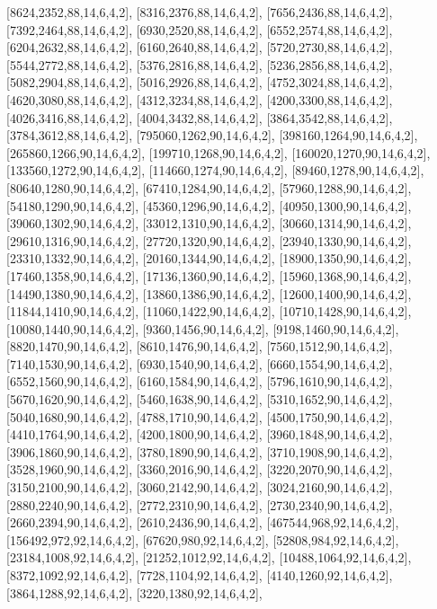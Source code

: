 \documentclass[12pt]{amsart}
\begin{document}
[8624,2352,88,14,6,4,2],   [8316,2376,88,14,6,4,2],   [7656,2436,88,14,6,4,2],   [7392,2464,88,14,6,4,2],   [6930,2520,88,14,6,4,2],   [6552,2574,88,14,6,4,2],
[6204,2632,88,14,6,4,2],   [6160,2640,88,14,6,4,2],   [5720,2730,88,14,6,4,2],   [5544,2772,88,14,6,4,2],   [5376,2816,88,14,6,4,2],   [5236,2856,88,14,6,4,2],
[5082,2904,88,14,6,4,2],   [5016,2926,88,14,6,4,2],   [4752,3024,88,14,6,4,2],   [4620,3080,88,14,6,4,2],   [4312,3234,88,14,6,4,2],   [4200,3300,88,14,6,4,2],
[4026,3416,88,14,6,4,2],   [4004,3432,88,14,6,4,2],   [3864,3542,88,14,6,4,2],   [3784,3612,88,14,6,4,2],   [795060,1262,90,14,6,4,2],   [398160,1264,90,14,6,4,2],
[265860,1266,90,14,6,4,2],   [199710,1268,90,14,6,4,2],   [160020,1270,90,14,6,4,2],   [133560,1272,90,14,6,4,2],   [114660,1274,90,14,6,4,2],
[89460,1278,90,14,6,4,2],   [80640,1280,90,14,6,4,2],   [67410,1284,90,14,6,4,2],   [57960,1288,90,14,6,4,2],   [54180,1290,90,14,6,4,2],   [45360,1296,90,14,6,4,2],
[40950,1300,90,14,6,4,2],   [39060,1302,90,14,6,4,2],   [33012,1310,90,14,6,4,2],   [30660,1314,90,14,6,4,2],   [29610,1316,90,14,6,4,2],   [27720,1320,90,14,6,4,2],
[23940,1330,90,14,6,4,2],   [23310,1332,90,14,6,4,2],   [20160,1344,90,14,6,4,2],   [18900,1350,90,14,6,4,2],   [17460,1358,90,14,6,4,2],   [17136,1360,90,14,6,4,2],
[15960,1368,90,14,6,4,2],   [14490,1380,90,14,6,4,2],   [13860,1386,90,14,6,4,2],   [12600,1400,90,14,6,4,2],   [11844,1410,90,14,6,4,2],   [11060,1422,90,14,6,4,2],
[10710,1428,90,14,6,4,2],   [10080,1440,90,14,6,4,2],   [9360,1456,90,14,6,4,2],   [9198,1460,90,14,6,4,2],   [8820,1470,90,14,6,4,2],   [8610,1476,90,14,6,4,2],
[7560,1512,90,14,6,4,2],   [7140,1530,90,14,6,4,2],   [6930,1540,90,14,6,4,2],   [6660,1554,90,14,6,4,2],   [6552,1560,90,14,6,4,2],   [6160,1584,90,14,6,4,2],
[5796,1610,90,14,6,4,2],   [5670,1620,90,14,6,4,2],   [5460,1638,90,14,6,4,2],   [5310,1652,90,14,6,4,2],   [5040,1680,90,14,6,4,2],   [4788,1710,90,14,6,4,2],
[4500,1750,90,14,6,4,2],   [4410,1764,90,14,6,4,2],   [4200,1800,90,14,6,4,2],   [3960,1848,90,14,6,4,2],   [3906,1860,90,14,6,4,2],   [3780,1890,90,14,6,4,2],
[3710,1908,90,14,6,4,2],   [3528,1960,90,14,6,4,2],   [3360,2016,90,14,6,4,2],   [3220,2070,90,14,6,4,2],   [3150,2100,90,14,6,4,2],   [3060,2142,90,14,6,4,2],
[3024,2160,90,14,6,4,2],   [2880,2240,90,14,6,4,2],   [2772,2310,90,14,6,4,2],   [2730,2340,90,14,6,4,2],   [2660,2394,90,14,6,4,2],   [2610,2436,90,14,6,4,2],
[467544,968,92,14,6,4,2],   [156492,972,92,14,6,4,2],   [67620,980,92,14,6,4,2],   [52808,984,92,14,6,4,2],   [23184,1008,92,14,6,4,2],   [21252,1012,92,14,6,4,2],
[10488,1064,92,14,6,4,2],   [8372,1092,92,14,6,4,2],   [7728,1104,92,14,6,4,2],   [4140,1260,92,14,6,4,2],   [3864,1288,92,14,6,4,2],   [3220,1380,92,14,6,4,2],
\end{document}
